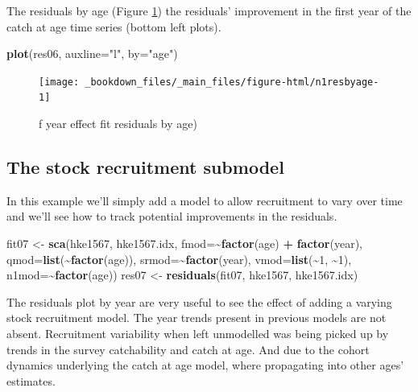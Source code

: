 \documentclass[
]{book}
\newenvironment{Shaded}{\begin{snugshade}}{\end{snugshade}}
\newcommand{\AttributeTok}[1]{\textcolor[rgb]{0.13,0.29,0.53}{#1}}
\newcommand{\DecValTok}[1]{\textcolor[rgb]{0.00,0.00,0.81}{#1}}
\newcommand{\FunctionTok}[1]{\textcolor[rgb]{0.13,0.29,0.53}{\textbf{#1}}}
\newcommand{\NormalTok}[1]{#1}
\newcommand{\OtherTok}[1]{\textcolor[rgb]{0.56,0.35,0.01}{#1}}
\newcommand{\SpecialCharTok}[1]{\textcolor[rgb]{0.81,0.36,0.00}{\textbf{#1}}}
\newcommand{\StringTok}[1]{\textcolor[rgb]{0.31,0.60,0.02}{#1}}
\begin{document}
The residuals by age (Figure \ref{fig:n1resbyage}) the residuals' improvement in the first year of the catch at age time series (bottom left plots).

\begin{Shaded}
\begin{Highlighting}[]
\FunctionTok{plot}\NormalTok{(res06, }\AttributeTok{auxline=}\StringTok{"l"}\NormalTok{, }\AttributeTok{by=}\StringTok{"age"}\NormalTok{)}
\end{Highlighting}
\end{Shaded}

\begin{figure}
\texttt{[image: \_bookdown\_files/\_main\_files/figure-html/n1resbyage-1]} \caption{f year effect fit residuals by age)}\label{fig:n1resbyage}
\end{figure}

\hypertarget{the-stock-recruitment-submodel}{%
\subsection{The stock recruitment submodel}\label{the-stock-recruitment-submodel}}

In this example we'll simply add a model to allow recruitment to vary over time and we'll see how to track potential improvements in the residuals.

\begin{Shaded}
\begin{Highlighting}[]
\NormalTok{fit07 }\OtherTok{\textless{}{-}} \FunctionTok{sca}\NormalTok{(hke1567, hke1567.idx, }\AttributeTok{fmod=}\SpecialCharTok{\textasciitilde{}}\FunctionTok{factor}\NormalTok{(age) }\SpecialCharTok{+} \FunctionTok{factor}\NormalTok{(year), }\AttributeTok{qmod=}\FunctionTok{list}\NormalTok{(}\SpecialCharTok{\textasciitilde{}}\FunctionTok{factor}\NormalTok{(age)), }\AttributeTok{srmod=}\SpecialCharTok{\textasciitilde{}}\FunctionTok{factor}\NormalTok{(year), }\AttributeTok{vmod=}\FunctionTok{list}\NormalTok{(}\SpecialCharTok{\textasciitilde{}}\DecValTok{1}\NormalTok{, }\SpecialCharTok{\textasciitilde{}}\DecValTok{1}\NormalTok{),  }\AttributeTok{n1mod=}\SpecialCharTok{\textasciitilde{}}\FunctionTok{factor}\NormalTok{(age))}
\NormalTok{res07 }\OtherTok{\textless{}{-}} \FunctionTok{residuals}\NormalTok{(fit07, hke1567, hke1567.idx)}
\end{Highlighting}
\end{Shaded}

The residuals plot by year are very useful to see the effect of adding a varying stock recruitment model. The year trends present in previous models are not absent. Recruitment variability when left unmodelled was being picked up by trends in the survey catchability and catch at age. And due to the cohort dynamics underlying the catch at age model, where propagating into other ages' estimates.
\end{document}

